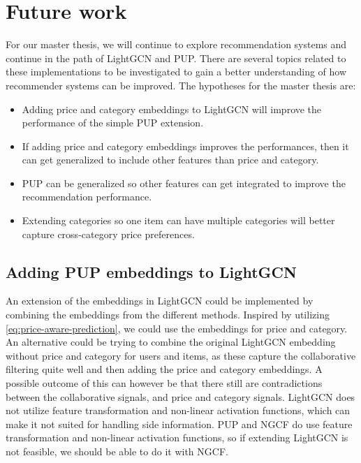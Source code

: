 \section{Future work}\label{sec:future-work}
For our master thesis, we will continue to explore recommendation systems and continue in the path of LightGCN and PUP.
There are several topics related to these implementations to be investigated to gain a better understanding of how recommender systems can be improved.
The hypotheses for the master thesis are:
\begin{itemize}
    \item Adding price and category embeddings to LightGCN will improve the performance of the simple PUP extension.
    \item If adding price and category embeddings improves the performances, then it can get generalized to include other features than price and category.
    \item PUP can be generalized so other features can get integrated to improve the recommendation performance.
    \item Extending categories so one item can have multiple categories will better capture cross-category price preferences.
\end{itemize}

\subsection{Adding PUP embeddings to LightGCN}
An extension of the embeddings in LightGCN could be implemented by combining the embeddings from the different methods.
Inspired by utilizing \autoref{eq:price-aware-prediction}, we could use the embeddings for price and category.
An alternative could be trying to combine the original LightGCN embedding without price and category for users and items, as these capture the collaborative filtering quite well and then adding the price and category embeddings.
A possible outcome of this can however be that there still are contradictions between the collaborative signals, and price and category signals.
LightGCN does not utilize feature transformation and non-linear activation functions, which can make it not suited for handling side information.
PUP and NGCF do use feature transformation and non-linear activation functions, so if extending LightGCN is not feasible, we should be able to do it with NGCF.

